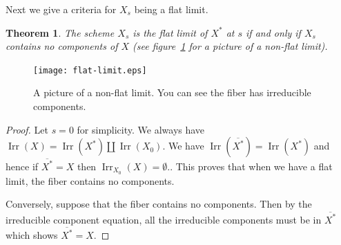 \documentclass[12pt]{article}
\numberwithin{equation}{section}
\newtheorem{theorem}{Theorem}[subsection]
\theoremstyle{definition}
\theoremstyle{remark}
\newcommand{\Irr}{\operatorname{Irr}}
\begin{document}
Next we give a criteria for $X_s$ being a flat limit. 

\begin{theorem}
	The scheme $X_s$ is the flat limit of $X^*$ at $s$ if and only if $X_s$ contains no components of $X$ (see figure~\ref{fig:flat-limit} for a picture of a non-flat limit).
\end{theorem}

	\begin{figure}[h]
	\begin{center}
		\texttt{[image: flat-limit.eps]}
	\end{center}
	\caption{A picture of a non-flat limit. You can see the fiber has irreducible components.}\label{fig:flat-limit}
\end{figure}


\begin{proof}
	Let $s=0$ for simplicity.
	We always have $\Irr(X) = \Irr(X^*) \amalg \Irr(X_0)$.
	We have $\Irr(\overline{X^*}) = \Irr(X^*)$ and hence if $\overline{X^*}=X$ then $\Irr_{X_0}(X)=\emptyset.$.  
	This proves that when we have a flat limit, the fiber contains no components. 
	
	Conversely, suppose that the fiber contains no components. 
	Then by the irreducible component equation, all the irreducible components must be in $\overline{X^*}$ which shows $\overline{X^*}=X$.
\end{proof}
\end{document}
